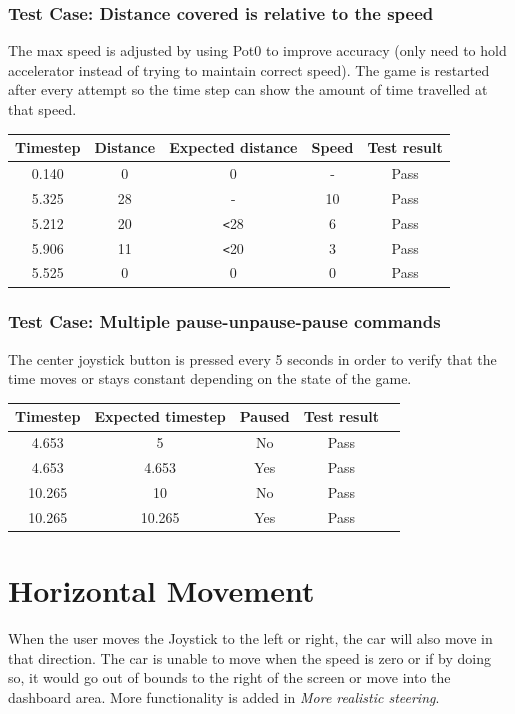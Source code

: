 \documentclass{article}
\begin{document}
\subsubsection*{Test Case: Distance covered is relative to the speed}
The max speed is adjusted by using Pot0 to improve accuracy (only need to hold accelerator instead of trying to maintain correct speed). The game is restarted after every attempt so the time step can show the amount of time travelled at that speed.
\begin{center}
\begin{tabular}{ c c c c c }
Timestep	& Distance	& Expected distance	& Speed	& Test result \\ \hline
0.140		& 0		& 0				& -		& Pass	\\
5.325		& 28		& - 				& 10		& Pass	\\
5.212		& 20		& \verb|<|28		& 6		& Pass	\\
5.906		& 11		& \verb|<|20		& 3		& Pass	\\
5.525		& 0		& 0				& 0		& Pass	\\
\end{tabular}
\end{center}

\subsubsection*{Test Case: Multiple pause-unpause-pause commands}
The center joystick button is pressed every 5 seconds in order to verify that the time moves or stays constant depending on the state of the game. 
\begin{center}
\begin{tabular}{ c c c c c }
Timestep	& Expected timestep	& Paused	& Test result	\\ \hline
4.653		& 5				& No		& Pass	\\
4.653		& 4.653			& Yes		& Pass	\\
10.265	& 10				& No		& Pass	\\
10.265	& 10.265			& Yes		& Pass	\\ \hline
\end{tabular}
\end{center}
\clearpage

\section{Horizontal Movement}
When the user moves the Joystick to the left or right, the car will also move in that direction. The car is unable to move when the speed is zero or if by doing so, it would go out of bounds to the right of the screen or move into the dashboard area. More functionality is added in \emph{More realistic steering}.
\end{document}

